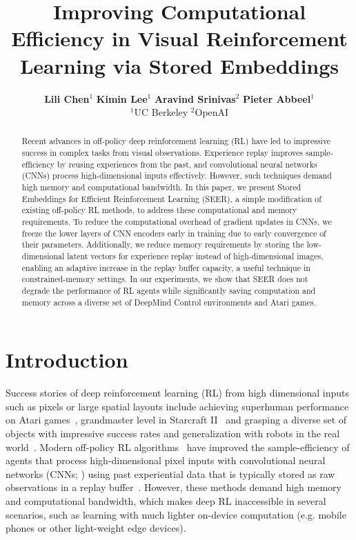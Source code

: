 \documentclass{article}
\title{Improving Computational Efficiency in Visual Reinforcement Learning via Stored Embeddings}
\author{\qquad
  \textbf{Lili Chen}$^{1}$
  \qquad
  \textbf{Kimin Lee}$^{1}$
  \qquad
  \textbf{Aravind Srinivas}$^{2}$
  \qquad
  \textbf{Pieter Abbeel}$^{1}$
  \qquad
  \\
  $^{1}$UC Berkeley \vspace{.1em} \hspace{4pt}
  $^{2}$OpenAI \vspace{.1em} \hspace{4pt}
}
\begin{document}
\maketitle

\begin{abstract}
Recent advances in off-policy deep reinforcement learning (RL) have led to impressive success in complex tasks from visual observations. Experience replay improves sample-efficiency by reusing experiences from the past, and convolutional neural networks (CNNs) process high-dimensional inputs effectively. However, such techniques demand high memory and computational bandwidth. In this paper, we present Stored Embeddings for Efficient Reinforcement Learning (SEER), a simple modification of existing off-policy RL methods, to address these computational and memory requirements.
To reduce the computational overhead of gradient updates in CNNs, we freeze the lower layers of CNN encoders early in training due to early convergence of their parameters. Additionally, we reduce memory requirements by storing the low-dimensional latent vectors for experience replay instead of high-dimensional images, enabling an adaptive increase in the replay buffer capacity, a useful technique in constrained-memory settings. In our experiments, we show that SEER does not degrade the performance of RL agents while significantly saving computation and memory across a diverse set of DeepMind Control environments and Atari games. 

\end{abstract}

\section{Introduction}
Success stories of deep reinforcement learning (RL) from high dimensional inputs such as pixels or large spatial layouts include achieving superhuman performance on Atari games~\citep{mnih2015human, schrittwieser2019mastering,  badia2020agent57}, grandmaster level in Starcraft II~\citep{vinyals2019grandmaster} and grasping a diverse set of objects with impressive success rates and generalization with robots in the real world~\citep{kalashnikov2018qt}.
Modern off-policy RL algorithms~\citep{mnih2015human, hessel2018rainbow, hafner2018learning, hafner2019dream, srinivas2020curl, kostrikov2020image, laskin2020reinforcement} have improved the sample-efficiency of agents that process high-dimensional pixel inputs with convolutional neural networks (CNNs; \citealt{lecun1998gradient}) using past experiential data that is typically stored as raw observations in a replay buffer~\citep{lin1992self}.
However, these methods demand high memory and computational bandwidth, which makes deep RL inaccessible in several scenarios, such as learning with much lighter on-device computation (e.g. mobile phones or other light-weight edge devices).
\end{document}
